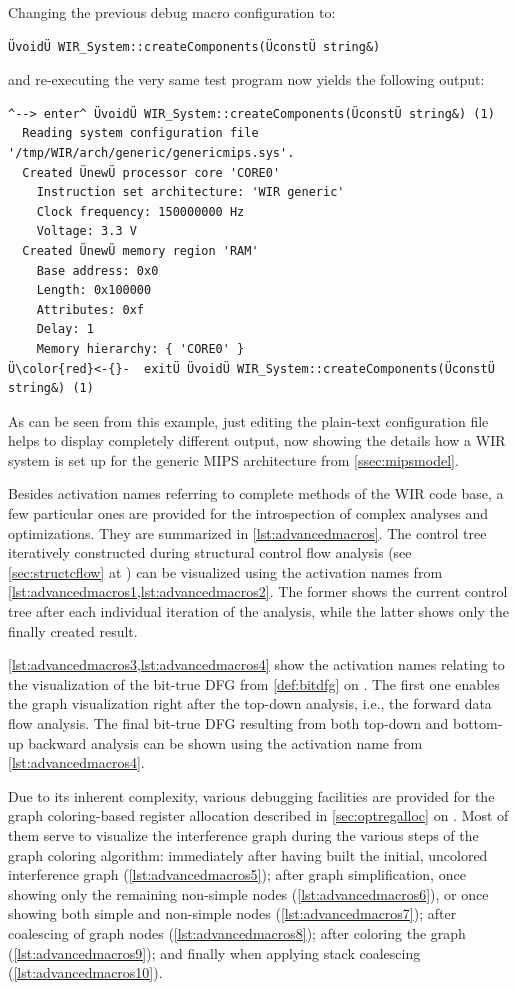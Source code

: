 Changing the previous debug macro configuration to:
\begin{lstlisting}[style=code]
ÜvoidÜ WIR_System::createComponents(ÜconstÜ string&)
\end{lstlisting}
and re-executing the very same test program now yields the following output:
\begin{lstlisting}[style=code]
^--> enter^ ÜvoidÜ WIR_System::createComponents(ÜconstÜ string&) (1)
  Reading system configuration file '/tmp/WIR/arch/generic/genericmips.sys'.
  Created ÜnewÜ processor core 'CORE0'
    Instruction set architecture: 'WIR generic'
    Clock frequency: 150000000 Hz
    Voltage: 3.3 V
  Created ÜnewÜ memory region 'RAM'
    Base address: 0x0
    Length: 0x100000
    Attributes: 0xf
    Delay: 1
    Memory hierarchy: { 'CORE0' }
Ü\color{red}<-{}-  exitÜ ÜvoidÜ WIR_System::createComponents(ÜconstÜ string&) (1)
\end{lstlisting}
As can be seen from this example, just editing the plain-text configuration file helps to display completely different output, now showing the details how a \gls{WIR} system is set up for the generic MIPS architecture from \cref{ssec:mipsmodel}.

Besides activation names referring to complete methods of the \gls{WIR} code base, a few particular ones are provided for the introspection of complex analyses and optimizations.
They are summarized in \cref{lst:advancedmacros}.
The control tree iteratively constructed during structural control flow analysis (see \cref{sec:structcflow} at ) can be visualized using the activation names from \cref{lst:advancedmacros1,lst:advancedmacros2}.
The former shows the current control tree after each individual iteration of the analysis, while the latter shows only the finally created result.

\cref{lst:advancedmacros3,lst:advancedmacros4} show the activation names relating to the visualization of the bit-true \gls{DFG} from \cref{def:bitdfg} on .
The first one enables the graph visualization right after the top-down analysis, i.e., the forward data flow analysis.
The final bit-true \gls{DFG} resulting from both top-down and bottom-up backward analysis can be shown using the activation name from \cref{lst:advancedmacros4}.

Due to its inherent complexity, various debugging facilities are provided for the graph coloring-based register allocation described in \cref{sec:optregalloc} on .
Most of them serve to visualize the interference graph during the various steps of the graph coloring algorithm: immediately after having built the initial, uncolored interference graph (\cref{lst:advancedmacros5}); after graph simplification, once showing only the remaining non-simple nodes (\cref{lst:advancedmacros6}), or once showing both simple and non-simple nodes (\cref{lst:advancedmacros7}); after coalescing of graph nodes (\cref{lst:advancedmacros8}); after coloring the graph (\cref{lst:advancedmacros9}); and finally when applying stack coalescing (\cref{lst:advancedmacros10}).

